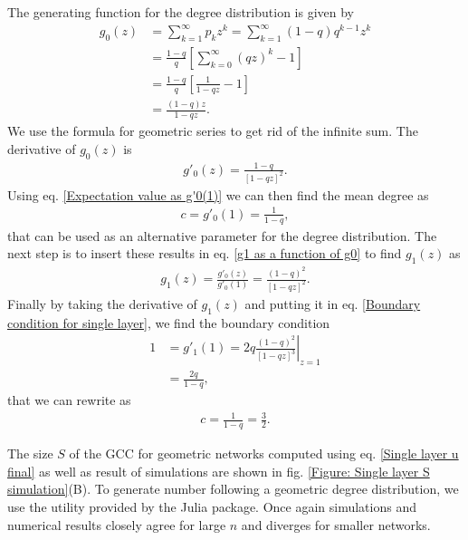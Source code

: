 \documentclass[
11pt, %
american, %
singlespacing, %
final, %
nolistspacing, %
liststotoc, %
headsepline, %
]{MastersDoctoralThesis} %
\begin{document}
The generating function for the degree distribution is given by
\begin{align}
	g_0(z) &= \sum_{k = 1}^\infty p_k z^k = \sum_{k=1}^\infty (1 - q) q^{k-1} z^k \\
		&= \frac{1 - q}{q} \left[ \sum_{k = 0}^\infty \left(q z\right)^k - 1\right] \\
		&= \frac{1 - q}{q} \left[\frac{1}{1 - q z} - 1 \right]\\
		&= \frac{(1 - q) z}{1 - q z}. \label{g0 for exponential}
\end{align}
We use the formula for geometric series to get rid of the infinite sum. The derivative of $g_0(z)$ is
\begin{align}
	g'_0(z) = \frac{1 - q}{\left[1 - q z\right]^2}.
\end{align}
Using eq. \eqref{Expectation value as g'0(1)} we can then find the mean degree as
\begin{align}
	c = g'_0(1) = \frac{1}{1 - q},
\end{align}
that can be used as an alternative parameter for the degree distribution. The next step is to insert these results in eq. \eqref{g1 as a function of g0} to find $g_1(z)$ as
\begin{align}
	g_1(z) = \frac{g'_0(z)}{g'_0(1)} = \frac{(1 - q)^2}{\left[1 - q z\right]^2}. \label{g1 for exponential}
\end{align}
Finally by taking the derivative of $g_1(z)$ and putting it in eq. \eqref{Boundary condition for single layer}, we find the boundary condition
\begin{align}
	1 &= g'_1(1) = \left. 2 q \frac{(1 - q)^2 }{\left[1 - q z\right]^3}\right\rvert_{z = 1} \\
		&= \frac{2 q}{1 - q},
\end{align}
that we can rewrite as
\begin{align}
	c = \frac{1}{1 - q} = \frac{3}{2}.
\end{align}

The size $S$ of the GCC for geometric networks computed using eq. \eqref{Single layer u final} as well as result of simulations are shown in fig. \ref{Figure: Single layer S simulation}(B). To generate number following a geometric degree distribution, we use the utility provided by the  Julia package. Once again simulations and numerical results closely agree for large $n$ and diverges for smaller networks.
\end{document}
